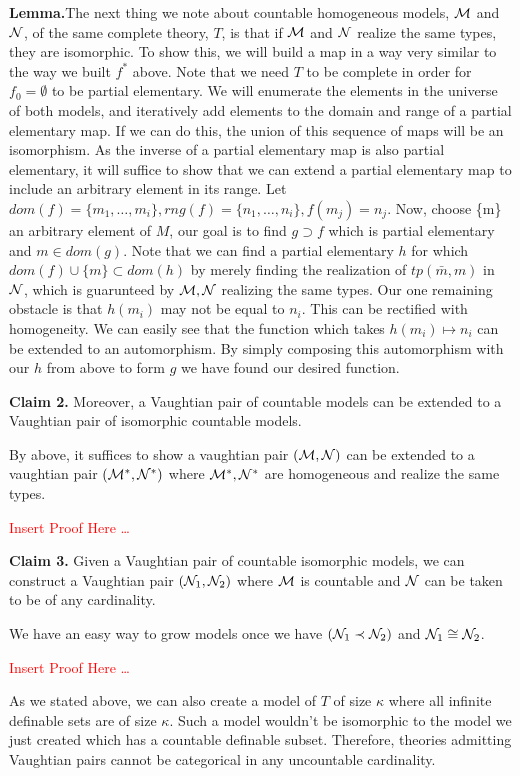 \textbf{Lemma.}The next thing we note about countable homogeneous models, \(\mathcal{M}\) and \(\mathcal{N}\), of the same complete theory, \(T\), is that if \(\mathcal{M}\) and \(\mathcal{N}\) realize the same types, they are isomorphic.
To show this, we will build a map in a way very similar to the way we built \(f^*\) above. 
Note that we need \(T\) to be complete in order for \(f_0=\emptyset\) to be partial elementary.
We will enumerate the elements in the universe of both models, and iteratively add elements to the domain and range of a partial elementary map. 
If we can do this, the union of this sequence of maps will be an isomorphism.
As the inverse of a partial elementary map is also partial elementary, it will suffice to show that we can extend a partial elementary map to include an arbitrary element in its range. 
Let \(dom(f) = \{m_1, \ldots, m_i\}, rng(f) = \{n_1, \ldots, n_i\}, f(m_j) = n_j\).
Now, choose \{m\} an arbitrary element of \(M\), our goal is to find \(g \supset f\) which is partial elementary and \(m \in dom(g)\).
Note that we can find a partial elementary \(h\) for which \(dom(f) \cup \{m\} \subset dom(h)\) by merely finding the realization of \(tp(\bar{m}, m)\) in \(\mathcal{N}\), which is guarunteed by \(\mathcal{M}, \mathcal{N}\) realizing the same types. 
Our one remaining obstacle is that \(h(m_i)\) may not be equal to \(n_i\). 
This can be rectified with homogeneity. We can easily see that the function which takes \(h(m_i) \mapsto n_i\) can be extended to an automorphism. 
By simply composing this automorphism with our \(h\) from above to form \(g\) we have found our desired function. 

\textbf{Claim 2.} Moreover, a Vaughtian pair of countable models can be extended to a Vaughtian pair of isomorphic countable models.

By above, it suffices to show a vaughtian pair \((\mathcal{M}, \mathcal{N})\) can be extended to a vaughtian pair \((\mathcal{M}^*, \mathcal{N}^*)\) where \(\mathcal{M}^*, \mathcal{N}^*\) are homogeneous and realize the same types. 

\textcolor{red}{Insert Proof Here \ldots}

\textbf{Claim 3.} Given a Vaughtian pair of countable isomorphic models, we can construct a Vaughtian pair \((\mathcal{N}_1, \mathcal{N}_2)\) where \(\mathcal{M}\) is countable and \(\mathcal{N}\) can be taken to be of any cardinality. %

We have an easy way to grow models once we have \((\mathcal{N}_1 \prec \mathcal{N}_2)\) and \(\mathcal{N}_1 \cong \mathcal{N}_2\). 

\textcolor{red}{Insert Proof Here \ldots} 

As we stated above, we can also create a model of \(T\) of size \(\kappa\) where all infinite definable sets are of size \(\kappa\). 
Such a model wouldn't be isomorphic to the model we just created which has a countable definable subset. 
Therefore, theories admitting Vaughtian pairs cannot be categorical in any uncountable cardinality.
